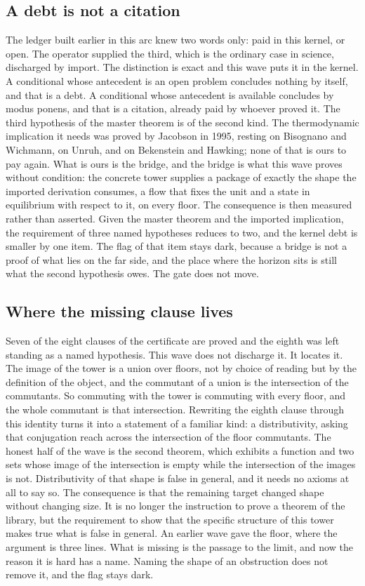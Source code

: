 \documentclass[11pt]{article}
\theoremstyle{definition}\newtheorem{deriv}{Derivation}
\begin{document}
\subsection*{A debt is not a citation}The ledger built earlier in this arc knew two words only: paid in this kernel, or open. The operator supplied the third, which is the ordinary case in science, discharged by import. The distinction is exact and this wave puts it in the kernel. A conditional whose antecedent is an open problem concludes nothing by itself, and that is a debt. A conditional whose antecedent is available concludes by modus ponens, and that is a citation, already paid by whoever proved it. The third hypothesis of the master theorem is of the second kind. The thermodynamic implication it needs was proved by Jacobson in 1995, resting on Bisognano and Wichmann, on Unruh, and on Bekenstein and Hawking; none of that is ours to pay again. What is ours is the bridge, and the bridge is what this wave proves without condition: the concrete tower supplies a package of exactly the shape the imported derivation consumes, a flow that fixes the unit and a state in equilibrium with respect to it, on every floor. The consequence is then measured rather than asserted. Given the master theorem and the imported implication, the requirement of three named hypotheses reduces to two, and the kernel debt is smaller by one item. The flag of that item stays dark, because a bridge is not a proof of what lies on the far side, and the place where the horizon sits is still what the second hypothesis owes. The gate does not move.

\subsection*{Where the missing clause lives}Seven of the eight clauses of the certificate are proved and the eighth was left standing as a named hypothesis. This wave does not discharge it. It locates it. The image of the tower is a union over floors, not by choice of reading but by the definition of the object, and the commutant of a union is the intersection of the commutants. So commuting with the tower is commuting with every floor, and the whole commutant is that intersection. Rewriting the eighth clause through this identity turns it into a statement of a familiar kind: a distributivity, asking that conjugation reach across the intersection of the floor commutants. The honest half of the wave is the second theorem, which exhibits a function and two sets whose image of the intersection is empty while the intersection of the images is not. Distributivity of that shape is false in general, and it needs no axioms at all to say so. The consequence is that the remaining target changed shape without changing size. It is no longer the instruction to prove a theorem of the library, but the requirement to show that the specific structure of this tower makes true what is false in general. An earlier wave gave the floor, where the argument is three lines. What is missing is the passage to the limit, and now the reason it is hard has a name. Naming the shape of an obstruction does not remove it, and the flag stays dark.
\end{document}
